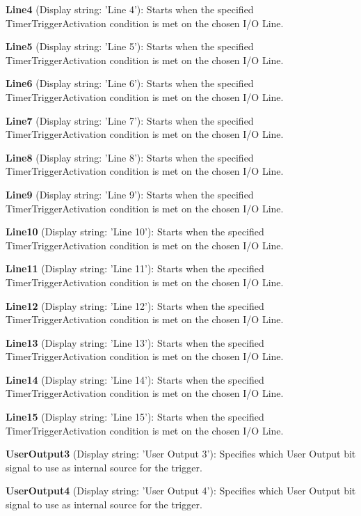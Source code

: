 \begin{DoxyItemize}
\item {\bfseries Line4} (Display string\+: 'Line 4')\+: Starts when the specified Timer\+Trigger\+Activation condition is met on the chosen I/\+O Line.
\item {\bfseries Line5} (Display string\+: 'Line 5')\+: Starts when the specified Timer\+Trigger\+Activation condition is met on the chosen I/\+O Line.
\item {\bfseries Line6} (Display string\+: 'Line 6')\+: Starts when the specified Timer\+Trigger\+Activation condition is met on the chosen I/\+O Line.
\item {\bfseries Line7} (Display string\+: 'Line 7')\+: Starts when the specified Timer\+Trigger\+Activation condition is met on the chosen I/\+O Line.
\item {\bfseries Line8} (Display string\+: 'Line 8')\+: Starts when the specified Timer\+Trigger\+Activation condition is met on the chosen I/\+O Line.
\item {\bfseries Line9} (Display string\+: 'Line 9')\+: Starts when the specified Timer\+Trigger\+Activation condition is met on the chosen I/\+O Line.
\item {\bfseries Line10} (Display string\+: 'Line 10')\+: Starts when the specified Timer\+Trigger\+Activation condition is met on the chosen I/\+O Line.
\item {\bfseries Line11} (Display string\+: 'Line 11')\+: Starts when the specified Timer\+Trigger\+Activation condition is met on the chosen I/\+O Line.
\item {\bfseries Line12} (Display string\+: 'Line 12')\+: Starts when the specified Timer\+Trigger\+Activation condition is met on the chosen I/\+O Line.
\item {\bfseries Line13} (Display string\+: 'Line 13')\+: Starts when the specified Timer\+Trigger\+Activation condition is met on the chosen I/\+O Line.
\item {\bfseries Line14} (Display string\+: 'Line 14')\+: Starts when the specified Timer\+Trigger\+Activation condition is met on the chosen I/\+O Line.
\item {\bfseries Line15} (Display string\+: 'Line 15')\+: Starts when the specified Timer\+Trigger\+Activation condition is met on the chosen I/\+O Line.
\item {\bfseries User\+Output3} (Display string\+: 'User Output 3')\+: Specifies which User Output bit signal to use as internal source for the trigger.
\item {\bfseries User\+Output4} (Display string\+: 'User Output 4')\+: Specifies which User Output bit signal to use as internal source for the trigger.

\end{DoxyItemize}

